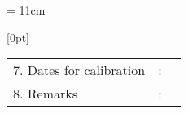 \headsep = 11cm
\setlength{\footskip}{80pt}
\begin{landscape}

\end{landscape}
\raisebox{9cm}[0pt]{
\begin{tabular}{p{4.8cm} p{0.1ex} p{3cm}}
7. Dates for calibration		&:&		 \makecell[tl]{ } \\
8. Remarks	 	 &:&		\makecell[tl]{} \\
\end{tabular}
}